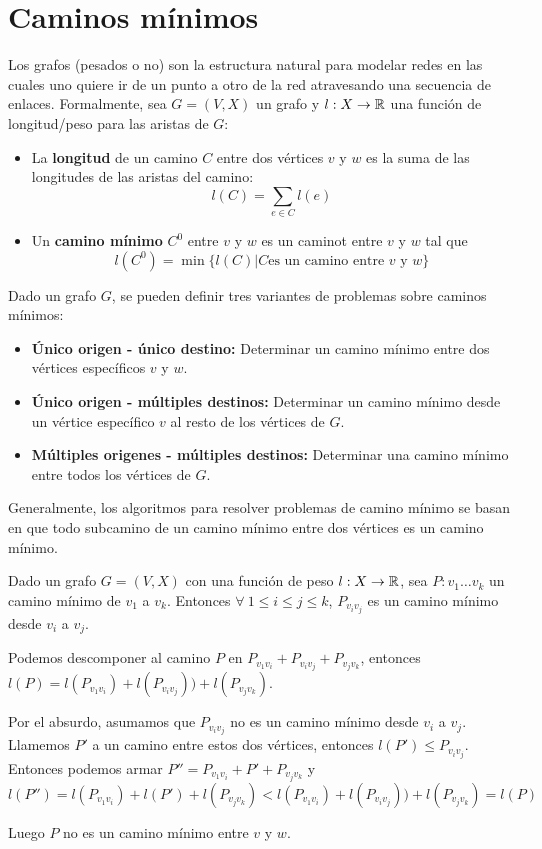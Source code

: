\section{Caminos mínimos}
Los grafos (pesados o no) son la estructura natural para modelar redes en las cuales uno quiere ir de un punto a otro de la red atravesando una secuencia de enlaces. Formalmente, sea \(G = (V, X)\) un grafo y \(l: X \to \mathbb{R}\) una función de longitud/peso para las aristas de \(G\):

\begin{itemize}
  \item La \textbf{longitud} de un camino \(C\) entre dos vértices \(v\) y \(w\) es la suma de las longitudes de las aristas del camino:
        \[l(C) = \sum_{e\in C}l(e)\]
  \item Un \textbf{camino mínimo} \(C^0\) entre \(v\) y \(w\) es un caminot entre \(v\) y \(w\) tal que \[l(C^0)=\min\{l(C) | C \text{es un camino entre } v \text{ y } w\}\]
\end{itemize}

Dado un grafo \(G\), se pueden definir tres variantes de problemas sobre caminos mínimos:\
\begin{itemize}
  \item \textbf{Único origen - único destino:} Determinar un camino mínimo entre dos vértices específicos \(v\) y \(w\).
  \item \textbf{Único origen - múltiples destinos:} Determinar un camino mínimo desde un vértice específico \(v\) al resto de los vértices de \(G\).
  \item \textbf{Múltiples origenes - múltiples destinos:} Determinar una camino mínimo entre todos los vértices de \(G\).
\end{itemize}

Generalmente, los algoritmos para resolver problemas de camino mínimo se basan en que todo subcamino de un camino mínimo entre dos vértices es un camino mínimo.

\begin{proposicion}\label{prop::CaminoMinimoEstaHechoDeMinimos}
  Dado un grafo \(G = (V, X)\) con una función de peso \(l: X \to \mathbb{R}\), sea \(P: v_1\dots v_k\) un camino mínimo de \(v_1\) a \(v_k\). Entonces \(\forall~1\leq i \leq j \leq k\), \(P_{v_iv_j}\) es un camino mínimo desde \(v_i\) a \(v_j\).
\end{proposicion}
\begin{demo}
  Podemos descomponer al camino \(P\) en \(P_{v_1v_i} + P_{v_iv_j} + P_{v_jv_k}\), entonces \(l(P) = l(P_{v_1v_i}) + l(P_{v_iv_j})) + l(P_{v_jv_k})\).

  Por el absurdo, asumamos que \(P_{v_iv_j}\) no es un camino mínimo desde \(v_i\) a \(v_j\). Llamemos \(P'\) a un camino entre estos dos vértices, entonces \(l(P') \leq P_{v_iv_j}\). Entonces podemos armar \(P'' = P_{v_1v_i} + P' + P_{v_jv_k}\) y
  \[l(P'') = l(P_{v_1v_i}) + l(P') + l(P_{v_jv_k}) < l(P_{v_1v_i}) + l(P_{v_iv_j})) + l(P_{v_jv_k}) = l(P)\]

  Luego \(P\) no es un camino mínimo entre \(v\) y \(w\).
\end{demo}

